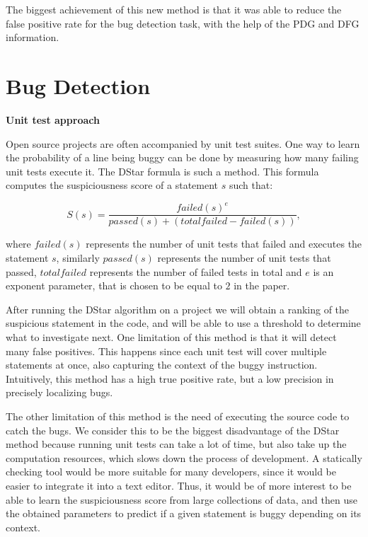 \documentclass[12pt,a4paper]{report}
\begin{document}
The biggest achievement of this new method is that it was able to reduce the false positive rate for the bug detection task, with the help of the PDG and DFG information.

\section{Bug Detection}

\textbf{Unit test approach}

Open source projects are often accompanied by unit test suites. One way to learn the probability of a line being buggy can be done by measuring how many failing unit tests execute it. The DStar formula \cite{6651713} is such a method. This formula computes the suspiciousness score of a statement $s$ such that:

\begin{equation}
S(s)=\frac{failed(s)^{e}}{passed(s) + (total failed - failed(s))},
\end{equation}

where $failed(s)$ represents the number of unit tests that failed and executes the statement $s$, similarly $passed(s)$ represents the number of unit tests that passed, $total failed$ represents the number of failed tests in total and $e$ is an exponent parameter, that is chosen to be equal to $2$ in the paper.

After running the DStar algorithm on a project we will obtain a ranking of the suspicious statement in the code, and will be able to use a threshold to determine what to investigate next. One limitation of this method is that it will detect many false positives. This happens since each unit test will cover multiple statements at once, also capturing the context of the buggy instruction. Intuitively, this method has a high true positive rate, but a low precision in precisely localizing bugs.

The other limitation of this method is the need of executing the source code to catch the bugs. We consider this to be the biggest disadvantage of the DStar method because running unit tests can take a lot of time, but also take up the computation resources, which slows down the process of development. A statically checking tool would be more suitable for many developers, since it would be easier to integrate it into a text editor. Thus, it would be of more interest to be able to learn the suspiciousness score from large collections of data, and then use the obtained parameters to predict if a given statement is buggy depending on its context.
\end{document}
